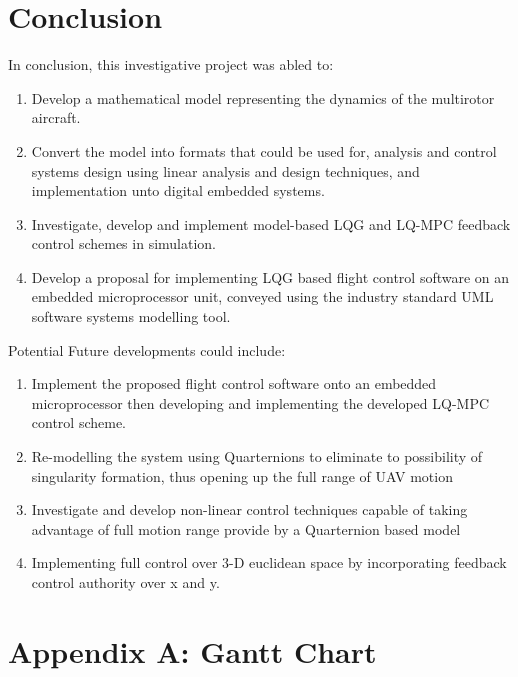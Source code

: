 \documentclass[12pt,a4paper,twoside]{report}
\begin{document}
	\newpage
	
	\chapter{Conclusion}
		
		In conclusion, this investigative project was abled to:
		\begin{enumerate}
			\item
				Develop a mathematical model representing the dynamics of the multirotor aircraft.
			\item
				Convert the model into formats that could be used for, analysis and control systems design using linear analysis and design techniques, and implementation unto digital embedded systems. 
			\item
				Investigate, develop and implement model-based LQG and LQ-MPC feedback control schemes in simulation.
			\item
				Develop a proposal for implementing LQG based flight control software on an embedded microprocessor unit, conveyed using the industry  standard UML software systems modelling tool.
		\end{enumerate}
		Potential Future developments could include:
		\begin{enumerate}
			\item
				Implement the proposed flight control software onto an embedded microprocessor then developing and implementing the developed LQ-MPC control scheme.
			\item
				Re-modelling the system using Quarternions to eliminate to possibility of singularity formation, thus opening up the full range of UAV motion
			\item	
				Investigate and develop non-linear control techniques capable of taking advantage of full motion range provide by a Quarternion based model 
			\item	
				Implementing full control over 3-D euclidean space by incorporating feedback control authority over x and y.
			\end{enumerate}
	
	\newpage
	
				
	
		
	
	\newpage
	\chapter*{Appendix A: Gantt Chart}
		
\end{document}
